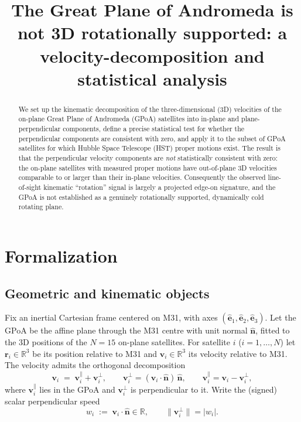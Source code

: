 \documentclass{amsart}
\theoremstyle{definition}
\begin{document}
\title{The Great Plane of Andromeda is not 3D rotationally supported: a
velocity-decomposition and statistical analysis}
\maketitle

\begin{abstract}
We set up the kinematic decomposition of the three-dimensional (3D)
velocities of the on-plane Great Plane of Andromeda (GPoA) satellites into
in-plane and plane-perpendicular components, define a precise statistical
test for whether the perpendicular components are consistent with zero, and
apply it to the subset of GPoA satellites for which Hubble Space Telescope
(HST) proper motions exist. The result is that the perpendicular velocity
components are \emph{not} statistically consistent with zero: the on-plane
satellites with measured proper motions have out-of-plane 3D velocities
comparable to or larger than their in-plane velocities. Consequently the
observed line-of-sight kinematic ``rotation'' signal is largely a projected
edge-on signature, and the GPoA is not established as a genuinely
rotationally supported, dynamically cold rotating plane.
\end{abstract}

\section{Formalization}

\subsection{Geometric and kinematic objects}
Fix an inertial Cartesian frame centered on M31, with axes
$(\hat{\bm e}_1,\hat{\bm e}_2,\hat{\bm e}_3)$. Let the GPoA be the affine
plane through the M31 centre with unit normal $\hat{\bm n}$, fitted to the
3D positions of the $N=15$ on-plane satellites. For satellite $i$
($i=1,\dots,N$) let $\bm r_i\in\mathbb R^3$ be its position relative to M31
and $\bm v_i\in\mathbb R^3$ its velocity relative to M31. The velocity admits
the orthogonal decomposition
\begin{equation}\label{eq:decomp}
  \bm v_i \;=\; \bm v_i^{\parallel} + \bm v_i^{\perp},
  \qquad
  \bm v_i^{\perp} = (\bm v_i\cdot\hat{\bm n})\,\hat{\bm n},
  \qquad
  \bm v_i^{\parallel} = \bm v_i - \bm v_i^{\perp},
\end{equation}
where $\bm v_i^{\parallel}$ lies in the GPoA and $\bm v_i^{\perp}$ is
perpendicular to it. Write the (signed) scalar perpendicular speed
\begin{equation}\label{eq:wperp}
  w_i \;:=\; \bm v_i\cdot\hat{\bm n} \in\mathbb R,
  \qquad
  \|\bm v_i^{\perp}\| = |w_i|.
\end{equation}
\end{document}
